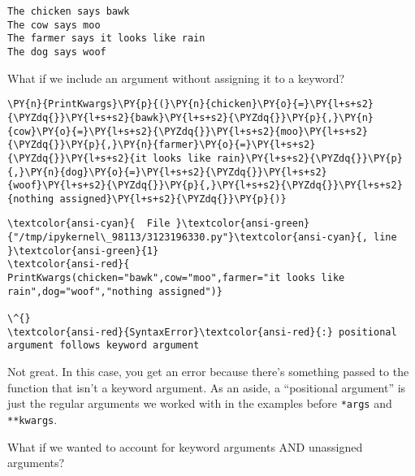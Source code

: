     \begin{Verbatim}[commandchars=\\\{\}]
The chicken says bawk
The cow says moo
The farmer says it looks like rain
The dog says woof
    \end{Verbatim}

    What if we include an argument without assigning it to a keyword?

    \begin{tcolorbox}[breakable, size=fbox, boxrule=1pt, pad at break*=1mm,colback=cellbackground, colframe=cellborder]
\begin{Verbatim}[commandchars=\\\{\}]
\PY{n}{PrintKwargs}\PY{p}{(}\PY{n}{chicken}\PY{o}{=}\PY{l+s+s2}{\PYZdq{}}\PY{l+s+s2}{bawk}\PY{l+s+s2}{\PYZdq{}}\PY{p}{,}\PY{n}{cow}\PY{o}{=}\PY{l+s+s2}{\PYZdq{}}\PY{l+s+s2}{moo}\PY{l+s+s2}{\PYZdq{}}\PY{p}{,}\PY{n}{farmer}\PY{o}{=}\PY{l+s+s2}{\PYZdq{}}\PY{l+s+s2}{it looks like rain}\PY{l+s+s2}{\PYZdq{}}\PY{p}{,}\PY{n}{dog}\PY{o}{=}\PY{l+s+s2}{\PYZdq{}}\PY{l+s+s2}{woof}\PY{l+s+s2}{\PYZdq{}}\PY{p}{,}\PY{l+s+s2}{\PYZdq{}}\PY{l+s+s2}{nothing assigned}\PY{l+s+s2}{\PYZdq{}}\PY{p}{)}
\end{Verbatim}
\end{tcolorbox}

    \begin{Verbatim}[commandchars=\\\{\}, frame=single, framerule=2mm, rulecolor=\color{outerrorbackground}]
\textcolor{ansi-cyan}{  File }\textcolor{ansi-green}{"/tmp/ipykernel\_98113/3123196330.py"}\textcolor{ansi-cyan}{, line }\textcolor{ansi-green}{1}
\textcolor{ansi-red}{    PrintKwargs(chicken="bawk",cow="moo",farmer="it looks like rain",dog="woof","nothing assigned")}
                                                                                                  \^{}
\textcolor{ansi-red}{SyntaxError}\textcolor{ansi-red}{:} positional argument follows keyword argument

    \end{Verbatim}

    Not great. In this case, you get an error because there's something
passed to the function that isn't a keyword argument. As an aside, a
``positional argument'' is just the regular arguments we worked with in
the examples before \texttt{*args} and \texttt{**kwargs}.

What if we wanted to account for keyword arguments AND unassigned
arguments?

